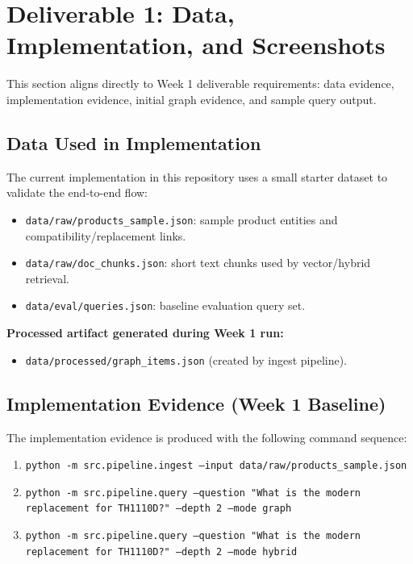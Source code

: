 \documentclass[11pt,a4paper]{article}
\begin{document}
\section{Deliverable 1: Data, Implementation, and Screenshots}
This section aligns directly to Week 1 deliverable requirements: data evidence, implementation evidence, initial graph evidence, and sample query output.

\subsection{Data Used in Implementation}
The current implementation in this repository uses a small starter dataset to validate the end-to-end flow:

\begin{itemize}
    \item \texttt{data/raw/products\_sample.json}: sample product entities and compatibility/replacement links.
    \item \texttt{data/raw/doc\_chunks.json}: short text chunks used by vector/hybrid retrieval.
    \item \texttt{data/eval/queries.json}: baseline evaluation query set.
\end{itemize}

\textbf{Processed artifact generated during Week 1 run:}
\begin{itemize}
    \item \texttt{data/processed/graph\_items.json} (created by ingest pipeline).
\end{itemize}

\subsection{Implementation Evidence (Week 1 Baseline)}
The implementation evidence is produced with the following command sequence:

\begin{enumerate}
    \item \texttt{python -m src.pipeline.ingest --input data/raw/products\_sample.json}
    \item \texttt{python -m src.pipeline.query --question "What is the modern replacement for TH1110D?" --depth 2 --mode graph}
    \item \texttt{python -m src.pipeline.query --question "What is the modern replacement for TH1110D?" --depth 2 --mode hybrid}
\end{enumerate}
\end{document}
